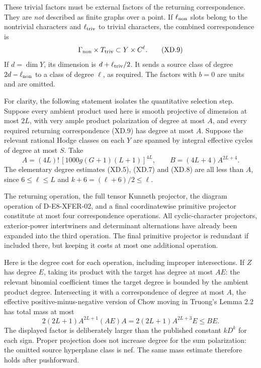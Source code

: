 These trivial factors must be external factors of the returning
correspondence.  They are \emph{not} described as finite graphs over
a point.  If \(\ell_{\rm non}\) slots belong to the nontrivial
characters and \(\ell_{\rm triv}\) to trivial characters, the
combined correspondence is
\[
                 \Gamma_{\rm non}\times T_{\rm triv}
                         \subset Y\times C^\ell.            \tag{XD.9}
\]
If \(d=\dim Y\), its dimension is \(d+\ell_{\rm triv}/2\).
It sends a source class of degree \(2d-\ell_{\rm non}\) to a
class of degree \(\ell\), as required.  The factors with \(b=0\)
are units and are omitted.

For clarity, the following statement isolates the quantitative
selection step.  Suppose every ambient product used here is smooth
projective of dimension at most \(2L\), with very ample product
polarization of degree at most \(A\), and every required returning
correspondence (XD.9) has degree at most \(A\).
Suppose the relevant rational Hodge classes on each \(Y\) are spanned
by integral effective cycles of degree at most \(S\).
Take
\[
 A=(4L)!\,[1000g(G+1)(L+1)]^{4L},\qquad
                         B=(4L+4)A^{2L+4}.                 \tag{XD.10}
\]
The elementary degree estimates (XD.5), (XD.7) and (XD.8) are all
less than \(A\), since \(6\leq\ell\leq L\) and
\(k+6=(\ell+6)/2\leq\ell\).

The returning operation, the full tensor Kunneth projector, the
diagram operation of D-E8-XFER-02, and a final coordinatewise
primitive projector constitute at most four correspondence
operations.  All cyclic-character projectors, exterior-power
intertwiners and determinant alternations have already been
expanded into the third operation.  The final primitive projector
is redundant if included there, but keeping it costs at most one
additional operation.

Here is the degree cost for each operation, including improper
intersections.  If \(Z\) has degree \(E\), taking its product with
the target has degree at most \(AE\): the relevant binomial
coefficient times the target degree is bounded by the ambient
product degree.  Intersecting it with a correspondence of degree
at most \(A\), the effective positive-minus-negative version of
Chow moving in Truong's Lemma 2.2 has total mass at most
\[
        2(2L+1)A^{2L+1}(AE)A
             =2(2L+1)A^{2L+3}E\leq BE.                     \tag{XD.11}
\]
The displayed factor is deliberately larger than the published
constant \(kD^k\) for each sign.  Proper projection does not
increase degree for the sum polarization: the omitted source
hyperplane class is nef.  The same mass estimate therefore
holds after pushforward.

